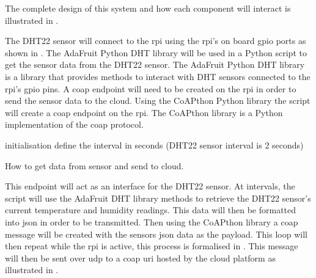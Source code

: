 The complete design of this system and how each component will interact
is illustrated in .

The DHT22 sensor will connect to the \gls{rpi} using the \gls{rpi}'s on board 
\gls{gpio} ports as shown in . 
The AdaFruit Python DHT library will be used in a Python script to get the 
sensor data from the DHT22 sensor.
The AdaFruit Python DHT library is a library that provides methods to interact 
with DHT sensors connected to the \gls{rpi}'s \gls{gpio} pins.
A \gls{coap} endpoint will need to be created on the \gls{rpi} in order to 
send the sensor data to the cloud. 
Using the CoAPthon Python library the script will create a \gls{coap} 
endpoint on the \gls{rpi}.
The CoAPthon library is a Python implementation of the \gls{coap} protocol.

\begin{center}
    \begin{algorithm}[htbp]
        initialisation\;
        define the interval in seconds (DHT22 sensor interval is 2 seconds)\;
        \caption{\label{alg:get_send_data_alg}How to get data from sensor and send to cloud.}
    \end{algorithm}
\end{center}

This endpoint will act as an interface for the DHT22 sensor. 
At intervals, the script will use the AdaFruit DHT library 
\citep{adafruit_adafruit_python_dht_2018} methods to retrieve 
the DHT22 sensor's current temperature and humidity readings. 
This data will then be formatted into \gls{json}
in order to be transmitted.
Then using the CoAPthon \citep{tanganelli_coapthon:_2015, tanganelli_coapthon3_2018} library a \gls{coap} 
message will be created with the sensors \gls{json} data as the payload. 
This loop will then repeat while the \gls{rpi} is active, this process is 
formalised in .
This message will then be sent over \gls{udp} to a \gls{coap} \gls{uri} 
hosted by the cloud platform as illustrated in .

